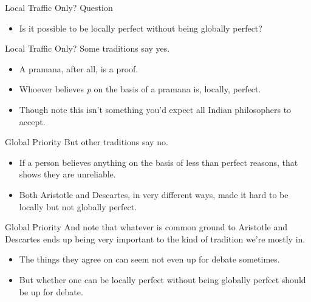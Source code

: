 \documentclass[
  17pt,
  letterpaper,
  ignorenonframetext,
  aspectratio=169,
  handout]{beamer}
\providecommand{\tightlist}{%
  \setlength{\itemsep}{0pt}\setlength{\parskip}{0pt}}\usepackage{longtable,booktabs,array}
\begin{document}
\begin{frame}{Local Traffic Only?}
\protect\hypertarget{local-traffic-only}{}
Question

\begin{itemize}[<+->]
\tightlist
\item
  Is it possible to be locally perfect without being globally perfect?
\end{itemize}
\end{frame}

\begin{frame}{Local Traffic Only?}
\protect\hypertarget{local-traffic-only-1}{}
Some traditions say yes.

\begin{itemize}[<+->]
\tightlist
\item
  A pramana, after all, is a proof.
\item
  Whoever believes \emph{p} on the basis of a pramana is, locally,
  perfect.
\item
  Though note this isn't something you'd expect all Indian philosophers
  to accept.
\end{itemize}
\end{frame}

\begin{frame}{Global Priority}
\protect\hypertarget{global-priority}{}
But other traditions say no.

\begin{itemize}[<+->]
\tightlist
\item
  If a person believes anything on the basis of less than perfect
  reasons, that shows they are unreliable.
\item
  Both Aristotle and Descartes, in very different ways, made it hard to
  be locally but not globally perfect.
\end{itemize}
\end{frame}

\begin{frame}{Global Priority}
\protect\hypertarget{global-priority-1}{}
And note that whatever is common ground to Aristotle and Descartes ends
up being very important to the kind of tradition we're mostly in.

\begin{itemize}[<+->]
\tightlist
\item
  The things they agree on can seem not even up for debate sometimes.
\item
  But whether one can be locally perfect without being globally perfect
  should be up for debate.
\end{itemize}
\end{frame}
\end{document}
